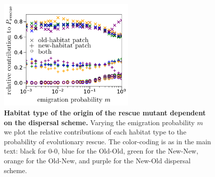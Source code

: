 \documentclass[11pt]{article}
\begin{document}
\begin{figure}[h!]
	\centering
	\includegraphics[width=0.6\textwidth]{figS7.pdf}
	\caption{\textbf{Habitat type of the origin of the rescue mutant dependent on the dispersal scheme.} Varying the emigration probability $m$ we plot the relative contributions of each habitat type to the probability of evolutionary rescue. The color-coding is as in the main text: black for 0-0, blue for the Old-Old, green for the New-New, orange for the Old-New, and purple for the New-Old dispersal scheme.}
	\label{Sfig:natal_habitat}
\end{figure}

%
%
\end{document}
